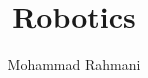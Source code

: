 \documentclass{article}
\begin{document}
	
	\title{Robotics}
	\author{Mohammad Rahmani}
	\date{}
	\maketitle
	
	
\end{document}
